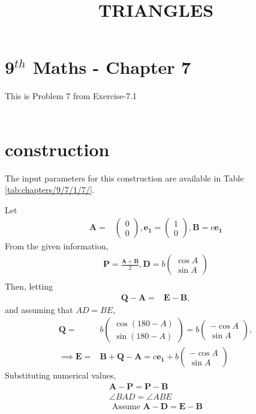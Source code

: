 \documentclass[10pt]{article}
\newcommand{\myvec}[1]{\ensuremath{\begin{pmatrix}#1\end{pmatrix}}}
\let\vec\mathbf{}
\begin{document}
\begin{center}
\title{\textbf{TRIANGLES}}
\date{\vspace{-5ex}} %
\maketitle
\end{center}
\section{9$^{th}$ Maths - Chapter 7}

This is Problem 7 from Exercise-7.1\\\\
\section{construction}
\fi
The input parameters for this construction are
available in Table
\ref{tab:chapters/9/7/1/7/}.
\begin{table}[h!]
	\centering
 	
\caption{}
\label{tab:chapters/9/7/1/7/}
\end{table}
Let
\begin{align}
\vec{A}=&\myvec{0\\0},\vec{e_1}=\myvec{1\\0},\vec{B}=c\vec{e_1}
\end{align}
From the given information,
\begin{align}
	\vec{P}=\frac{\vec{A}+\vec{B}}{2},\vec{D}=b\myvec{\cos{A}\\\sin{A}}\\
\end{align}
Then, letting
\begin{align}
\vec{Q}-\vec{A} =&\vec{E}-\vec{B}, 
\end{align}
and assuming that $AD = BE$,
\begin{align}
\vec{Q}=&b\myvec{\cos{(180-A)}\\\sin{(180-A)}}=b\myvec{-\cos{A}\\\sin{A}},\\
\implies \vec{E}=&\vec{B}+\vec{Q}-\vec{A}=c\vec{e_1}+b\myvec{-\cos{A}\\\sin{A}}
\end{align}
Substituting numerical values, 
\iffalse
\begin{align}
\vec{A}-\vec{P} = \vec{P}-\vec{B}\\
\angle BAD = \angle ABE\\
\text { Assume  }\vec{A}-\vec{D}=\vec{E}-\vec{B}
\end{align}
\end{document}
